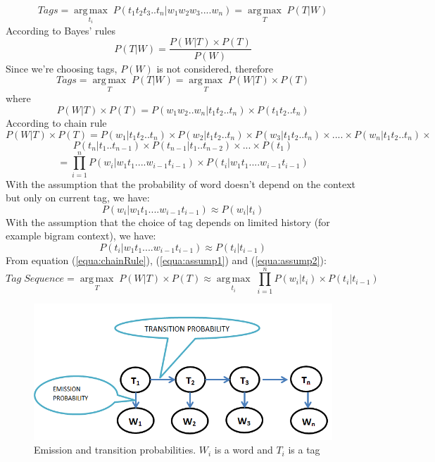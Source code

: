 $$ Tags = \operatorname*{arg\,max}_{t_i} \;P(t_1t_2t_3..t_n|w_1w_2w_3....w_n) = \operatorname*{arg\,max}_{T} \;P(T|W)$$
According to Bayes' rules 
$$P(T|W) = \frac{P(W|T) \times P(T)}{ P(W)} $$
Since we're choosing tags, $P(W)$ is not considered, therefore 
$$Tags = \operatorname*{arg\,max}_{T}\; P(T|W) = \operatorname*{arg\,max}_{T}\; P(W|T) \times P(T) $$
where 
$$ P(W|T) \times P(T)=P(w_1w_2..w_n|t_1t_2..t_n) \times P(t_1t_2..t_n)$$
According to chain rule
$$ P(W|T) \times P(T) = P(w_1|t_1t_2..t_n)\times P(w_2|t_1t_2..t_n) \times P(w_3|t_1t_2..t_n) \times .... \times P(w_n|t_1t_2..t_n) \times $$
$$ P(t_n|t_1..t_{n-1}) \times P(t_{n-1}|t_1..t_{n-2}) \times ...\times P(t_1) $$
\begin{equation}
\label{equa:chainRule}
= \prod_{i=1}^{n} P(w_i|w_1t_1....w_{i-1}t_{i-1}) \times P(t_i|w_1t_1....w_{i-1}t_{i-1})
\end{equation}
With the assumption that the probability of word doesn't depend on the context but only on current tag, we have: 
\begin{equation}
\label{equa:assump1}
P(w_i|w_1t_1....w_{i-1}t_{i-1})  \approx P(w_i|t_i)
\end{equation}
With the assumption that the choice of tag depends on limited history (for example bigram context), we have: 
\begin{equation}
\label{equa:assump2}
P(t_i|w_1t_1....w_{i-1}t_{i-1}) \approx P(t_i|t_{i-1})
\end{equation}
From equation (\ref{equa:chainRule}), (\ref{equa:assump1}) and (\ref{equa:assump2}):
\begin{equation}
\label{equa:hmmFinalEquation}
Tag\; Sequence = \operatorname*{arg\,max}_{T} \; P(W|T) \times P(T) \approx \operatorname*{arg\,max}_{t_i} \; \prod_{i=1}^{n} P(w_i|t_i) \times P(t_i|t_{i-1})
\end{equation}

\begin{figure}
\centering
\includegraphics[scale=0.5]{Figures/HMM_tagger}
\caption{Emission and transition probabilities. $W_i$ is a word and $T_i$ is a tag}
\label{fig:hmmTagger}
\end{figure}

